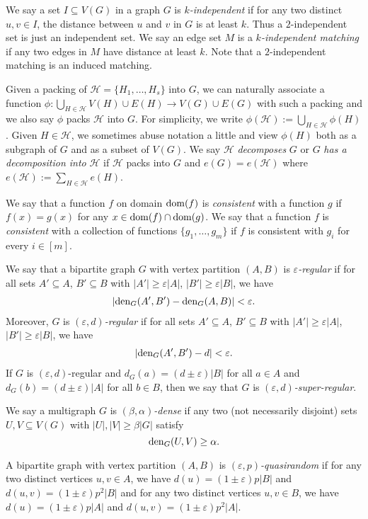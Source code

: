 \documentclass[a4paper, 11pt, reqno]{amsart}
\numberwithin{equation}{section}
\newcommand{\1}{{\rm 1\hspace*{-0.4ex}%
\rule{0.1ex}{1.52ex}\hspace*{0.2ex}}}
\newcommand{\cH}{\mathcal{H}}
\newcommand{\den}{{\rm den}}
\newcommand{\dom}{{\rm dom}}
\renewcommand{\epsilon}{\varepsilon}
\newcommand{\sub}{\subseteq}
\begin{document}
We say a set $I\sub V(G)$ in a graph $G$ is {\em $k$-independent} if for any two distinct $u,v\in I$, the distance between $u$ and $v$ in $G$ is at least $k$. 
Thus a $2$-independent set is just an independent set. 
We say an edge set $M$ is a {\em $k$-independent matching} if any two edges in $M$ have distance at least $k$. 
Note that a $2$-independent matching is an induced matching. 



Given a packing of $\cH=\{H_1,\dots, H_s\}$ into $G$, we can naturally associate a function $\phi: \bigcup_{H\in \cH} V(H)\cup E(H)\to V(G)\cup E(G)$ with such a packing and we also say $\phi$ packs $\cH$ into $G$.  For simplicity, we write $\phi(\cH):= \bigcup_{H\in \cH}\phi(H)$. 
Given $H\in \cH$, we sometimes abuse notation a little and view $\phi(H)$ both as a subgraph of $G$ and as a subset of $V(G)$.
We say $\cH$ \emph{decomposes} $G$ or $G$ \emph{has a decomposition into} $\cH$ if $\cH$ packs into $G$ and $e(G)=e(\cH)$ where $e(\cH):= \sum_{H\in \cH} e(H)$.



We say that a function $f$ on domain $\dom(f)$ is {\em consistent} with a function $g$ if $f(x)=g(x)$ for any $x \in \dom(f)\cap \dom(g)$. 
We say that a function $f$ is {\em consistent} with a collection of functions $\{g_1,\dots, g_{m}\}$ if $f$ is consistent with $g_i$ for every $i\in [m]$. 

We say that a bipartite graph $G$ with vertex partition $(A,B)$ is \emph{$\epsilon$-regular}
if for all sets $A'\subseteq A$, $B'\subseteq B$ with  $|A'|\geq \epsilon |A|$, $|B'|\geq \epsilon |B|$, we have
\begin{align*}
	| \den_G(A',B')- \den_G(A,B)| < \epsilon.
\end{align*}
Moreover,
$G$ is \emph{$(\epsilon,d)$-regular} if
for all sets $A'\subseteq A$, $B'\subseteq B$ with  $|A'|\geq \epsilon |A|$, $|B'|\geq \epsilon |B|$,
we have
\begin{align*}
	| \den_G(A',B')- d| < \epsilon.
\end{align*}
If $G$ is $(\epsilon,d)$-regular and $d_{G}(a)= (d\pm \epsilon)|B|$ for all $a\in A$ and $d_{G}(b)= (d\pm \epsilon)|A|$ for all $b\in B$, then we say that $G$ is {\em $(\epsilon,d)$-super-regular}.

We say a multigraph $G$ is {\em $(\beta,\alpha)$-dense} if any two (not necessarily disjoint) sets $U, V\subseteq V(G)$ with $|U|,|V|\geq \beta |G|$ satisfy
$$\den_G(U,V)\geq \alpha.$$


A bipartite graph with vertex partition $(A,B)$ is \emph{$(\epsilon,p)$-quasirandom}
if for any two distinct vertices $u,v \in A$, we have $d(u)=(1\pm \epsilon)p|B|$ and $d(u,v)=(1\pm \epsilon)p^2|B|$
and for any two distinct vertices $u,v \in B$, we have $d(u)=(1\pm \epsilon)p|A|$ and $d(u,v)=(1\pm \epsilon)p^2|A|$.
\end{document}
